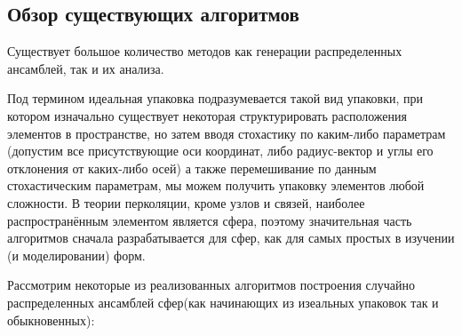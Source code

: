 \subsection{Обзор существующих алгоритмов}

Существует большое количество методов как генерации распределенных ансамблей, так и их анализа.

Под термином идеальная упаковка подразумевается такой вид упаковки, при котором изначально существует некоторая структурировать расположения элементов в пространстве, но затем вводя стохастику по каким-либо параметрам (допустим все присутствующие оси координат, либо радиус-вектор и углы его отклонения от каких-либо осей) а также перемешивание по данным стохастическим параметрам, мы можем получить упаковку элементов любой сложности. В теории перколяции, кроме узлов и связей, наиболее распространённым элементом является сфера, поэтому значительная часть алгоритмов сначала разрабатывается для сфер, как для самых простых в изучении (и моделировании) форм.

Рассмотрим некоторые из реализованных алгоритмов построения случайно распределенных ансамблей сфер(как начинающих из изеальных упаковок так и обыкновенных):

